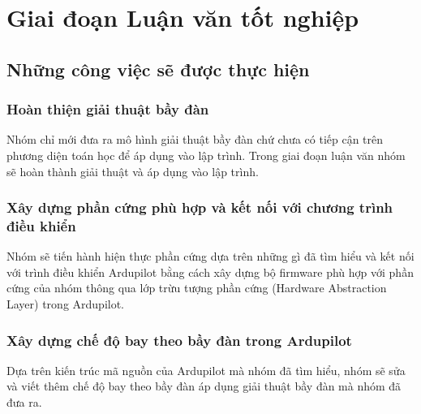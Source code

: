 \chapter{Giai đoạn Luận văn tốt nghiệp}
    \section{Những công việc sẽ được thực hiện}
        \subsection{Hoàn thiện giải thuật bầy đàn}
        Nhóm chỉ mới đưa ra mô hình giải thuật bầy đàn chứ chưa có tiếp cận trên phương diện toán học để áp dụng vào lập trình. Trong giai đoạn luận văn nhóm sẽ hoàn thành giải thuật và áp dụng vào lập trình. 
        \subsection{Xây dựng phần cứng phù hợp và kết nối với chương trình điều khiển}
        Nhóm sẽ tiến hành hiện thực phần cứng dựa trên những gì đã tìm hiểu và kết nối với trình điều khiển Ardupilot bằng cách xây dựng bộ firmware phù hợp với phần cứng của nhóm thông qua lớp trừu tượng phần cứng (Hardware Abstraction Layer) trong Ardupilot.
        \subsection{Xây dựng chế độ bay theo bầy đàn trong Ardupilot}
        Dựa trên kiến trúc mã nguồn của Ardupilot mà nhóm đã tìm hiểu, nhóm sẽ sửa và viết thêm chế độ bay theo bầy đàn áp dụng giải thuật bầy đàn mà nhóm đã đưa ra.
